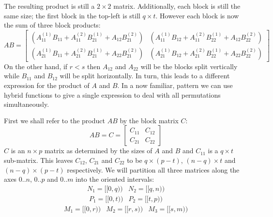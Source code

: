 The resulting product is still a $2 \times 2$ matrix.
Additionally, each block is still the same size; the first block in the top-left is still $q \times t$.
However each block is now the sum of three block products:
\begin{equation*}
	AB 	= 	\begin{bmatrix}
				\left( A_{11}^{(1)}B_{11}^{}+ A_{11}^{(2)}B_{21}^{(1)} + A_{12}^{}B_{21}^{(2)} \right) & 
				\left( A_{11}^{(1)}B_{12}^{}+ A_{11}^{(2)}B_{22}^{(1)} + A_{12}^{}B_{22}^{(2)} \right) \\
				\left( A_{21}^{(1)}B_{11}^{}+ A_{21}^{(2)}B_{21}^{(1)} + A_{22}^{}B_{21}^{(2)} \right) & 
				\left( A_{21}^{(1)}B_{12}^{}+ A_{21}^{(2)}B_{22}^{(1)} + A_{22}^{}B_{22}^{(2)} \right) 
			\end{bmatrix}
\end{equation*}
On the other hand, if $r < s$ then $A_{12}$ and $A_{22}$ will be the blocks split vertically while $B_{11}$ and $B_{12}$
will be split horizontally. 
In turn, this leads to a different expression for the product of $A$ and $B$.
In a now familiar, pattern we can use hybrid functions to give a single expression to deal with all permutations simultaneously.



First we shall refer to the product $AB$ by the block matrix $C$:
\begin{equation}
	AB = C = \begin{bmatrix} C_{11} & C_{12} \\ C_{21} & C_{22} \end{bmatrix}
\end{equation}
$C$ is an $n \times p$ matrix as determined by the sizes of $A$ and $B$ and $C_{11}$ is a $q \times t$ sub-matrix.
This leaves $C_{12}$, $C_{21}$ and $C_{22}$ to be $q \times (p-t)$, $(n-q) \times t$ and $(n-q) \times (p-t)$ respectively.
We will partition all three matrices along the axes $0.. n$, $0..p$ and $0..m$ into the oriented intervals:
\begin{equation*}\begin{array}{cc}
	N_1 = [\![0, q)\!) & N_2 = [\![q, n)\!) 
\end{array}\end{equation*}
\begin{equation*}\begin{array}{cc}
	P_1 = [\![0, t)\!) & P_2 = [\![t, p)\!)
\end{array}\end{equation*}
\begin{equation*}\begin{array}{ccc}
	M_1 = [\![0, r)\!) & M_2 = [\![r, s)\!) & M_3 = [\![s, m)\!)
\end{array}\end{equation*}


